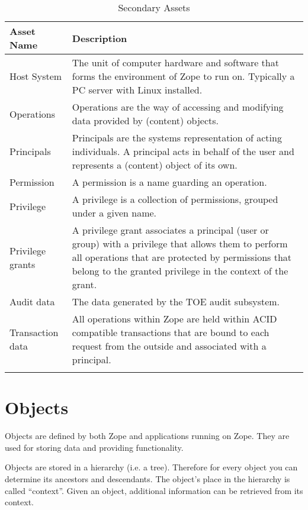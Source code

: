\documentclass[12pt,english]{scrbook}
\begin{document}
\begin{longtable}[c]{lp{10cm}}
  \toprule 
  Asset Name & Description \\
  \midrule\endhead
  Host System
   &
  The unit of computer hardware and software that forms the environment of Zope
  to run on. Typically a PC server with Linux installed.
   \\

  Operations
   & 
  Operations are the way of accessing and modifying
  data provided by (content) objects.
   \\

  Principals
   & 
  Principals are the systems representation of acting
  individuals. A principal acts in behalf of the user
  and represents a (content) object of its own.
   \\

  Permission
   & 
  A permission is a name guarding an operation.
   \\

  Privilege
   &
  A privilege is a collection of permissions, grouped under a given name.
  \\

  Privilege grants
   & 
  A privilege grant associates a principal (user or group) with a
  privilege that allows them to perform all operations that are 
  protected by permissions that belong to the granted privilege in the context
  of the grant.
   \\

  Audit data
   & 
  The data generated by the TOE audit subsystem.
   \\

  Transaction data
   & 
  All operations within Zope are held within ACID
  compatible transactions that are bound to each
  request from the outside and associated with a
  principal.
  \\
  \bottomrule
  \caption{Secondary Assets}
  \label{tab-sec-assets}

\end{longtable}

\section{Objects}

Objects are defined by both Zope and applications running on Zope. They are
used for storing data and providing functionality. 

Objects are stored in a hierarchy (i.e. a tree). Therefore for every object
you can determine its ancestors and descendants.  The object's place in the
hierarchy is called ``context''. Given an object, additional information can
be retrieved from its context.
\end{document}
